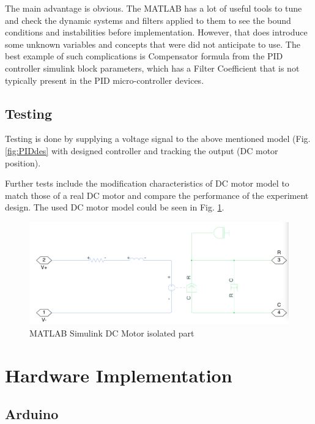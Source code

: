 \documentclass[]{final_report}
\begin{document}
The main advantage is obvious. The MATLAB has a lot of useful tools to tune and check the dynamic systems and filters applied to them to see the bound conditions and instabilities before implementation. However, that does introduce some unknown variables and concepts that were did not anticipate to use. The best example of such complications is Compensator formula from the PID controller simulink block parameters, which has a Filter Coefficient that is not typically present in the PID micro-controller devices.




\section{Testing}

Testing is done by supplying a voltage signal to the above mentioned model (Fig. \ref{fig:PIDdes} with designed controller and tracking the output (DC motor position). 

Further tests include the modification characteristics of DC motor model to match those of a real DC motor and compare the performance of the experiment design. The used DC motor model could be seen in Fig. \ref{fig:MatlabMotorDCpart}. 

\begin{figure} [h!]
\centerline{\includegraphics[width=.95\textwidth]{Screenshots for paper/matlab models/DC Motor.png}}
\caption{MATLAB Simulink DC Motor isolated part}
\label{fig:MatlabMotorDCpart}
\end{figure}



\chapter{Hardware Implementation}

\section{Arduino}
\end{document}
